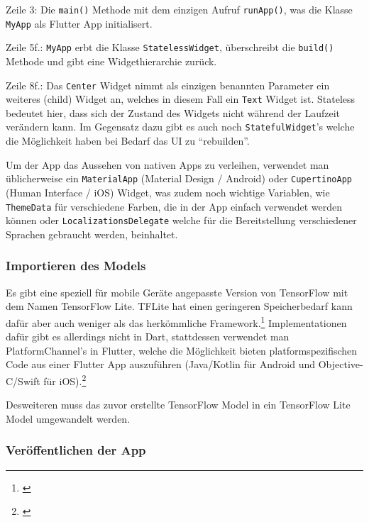 Zeile 3: Die \texttt{main()} Methode mit dem einzigen Aufruf \texttt{runApp()}, was die Klasse \texttt{MyApp} als Flutter App initialisert.

Zeile 5f.: \texttt{MyApp} erbt die Klasse \texttt{StatelessWidget}, überschreibt die \texttt{build()} Methode und gibt eine Widgethierarchie zurück.

Zeile 8f.: Das \texttt{Center} Widget nimmt als einzigen benannten Parameter ein weiteres (child) Widget an, welches in diesem Fall ein \texttt{Text} Widget ist. Stateless bedeutet hier, dass sich der Zustand des Widgets nicht während der Laufzeit verändern kann. Im Gegensatz dazu gibt es auch noch \texttt{StatefulWidget}'s welche die Möglichkeit haben bei Bedarf das UI zu "`rebuilden"'.

Um der App das Aussehen von nativen Apps zu verleihen, verwendet man üblicherweise ein \texttt{MaterialApp} (Material Design / Android) oder \texttt{CupertinoApp} (Human Interface / iOS) Widget, was zudem noch wichtige Variablen, wie \texttt{ThemeData} für verschiedene Farben, die in der App einfach verwendet werden können oder \texttt{LocalizationsDelegate} welche für die Bereitstellung verschiedener Sprachen gebraucht werden, beinhaltet.

\subsubsection{Importieren des Models}

Es gibt eine speziell für mobile Geräte angepasste Version von TensorFlow mit dem Namen TensorFlow Lite. TFLite hat einen geringeren Speicherbedarf kann dafür aber auch weniger als das herkömmliche Framework.\footnote{\cite{tflite}} Implementationen dafür gibt es allerdings nicht in Dart, stattdessen verwendet man PlatformChannel's in Flutter, welche die Möglichkeit bieten platformspezifischen Code aus einer Flutter App auszuführen (Java/Kotlin für Android und Objective-C/Swift für iOS).\footnote{\cite{flutterplatformcode}}

Desweiteren muss das zuvor erstellte TensorFlow Model in ein TensorFlow Lite Model umgewandelt werden.

\subsubsection{Veröffentlichen der App}

